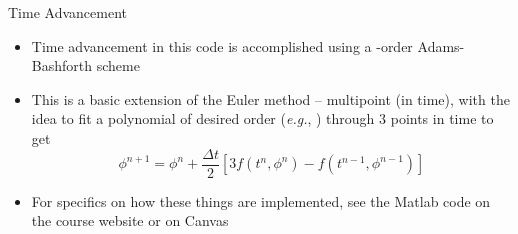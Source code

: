 \begin{frame}{Time Advancement}
\begin{itemize}
	\item Time advancement in this code is accomplished using a -order Adams-Bashforth scheme
	\item This is a basic extension of the Euler method -- multipoint (in time), with the idea to fit a polynomial of desired order (\textit{e.g.}, ) through 3 points in time to get
	$$\phi^{n+1} = \phi^n + \frac{\Delta t}{2} \left[ 3f(t^n,\phi^n) - f(t^{n-1}, \phi^{n-1})\right]$$
	\item For specifics on how these things are implemented, see the Matlab code on the course website or on Canvas
\end{itemize}

\end{frame}






